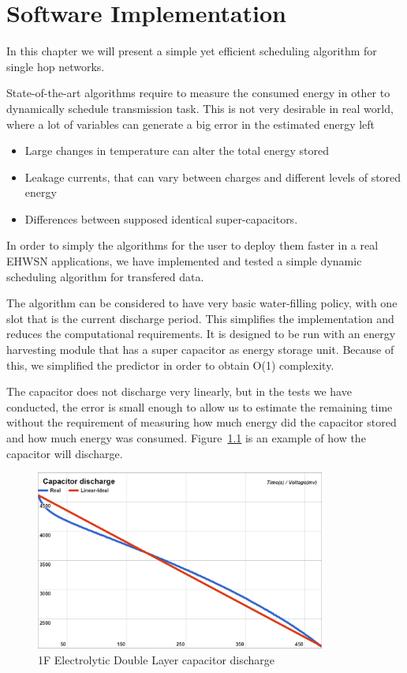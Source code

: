 \normalfont\normalsize
\chapter{Software Implementation}

In this chapter we will present a simple yet efficient scheduling algorithm for single hop networks.

State-of-the-art algorithms require to measure the consumed energy in other to dynamically schedule transmission
task. This is not very desirable in real world, where a lot of variables can generate a big error in the estimated energy left

\begin{itemize}
    \item Large changes in temperature can alter the total energy stored
    \item Leakage currents, that can vary between charges and different levels of stored energy
    \item Differences between supposed identical super-capacitors.
\end{itemize}

In order to simply the algorithms for the user to deploy them faster in a real EHWSN applications,
we have implemented and tested a simple dynamic scheduling algorithm for transfered data.

The algorithm can be considered to have very basic water-filling policy, with one slot that is
the current discharge period. This simplifies the implementation and reduces the computational
requirements. It is designed to be run with an energy harvesting module that has a super capacitor
as energy storage unit. Because of this, we simplified the predictor in order to obtain O(1)
complexity.

The capacitor does not discharge very linearly, but in the tests we have conducted, the error is
small enough to allow us to estimate the remaining time without the requirement of measuring how
much energy did the capacitor stored and how much energy was consumed.
Figure~\ref{fig:capdisch} is an example of how the capacitor will discharge.

\begin{figure}[ht] \centering
\includegraphics[width=0.85\textwidth]{img/capacitor.png}
\caption{1F Electrolytic Double Layer capacitor discharge}
\label{fig:capdisch}
\end{figure}

